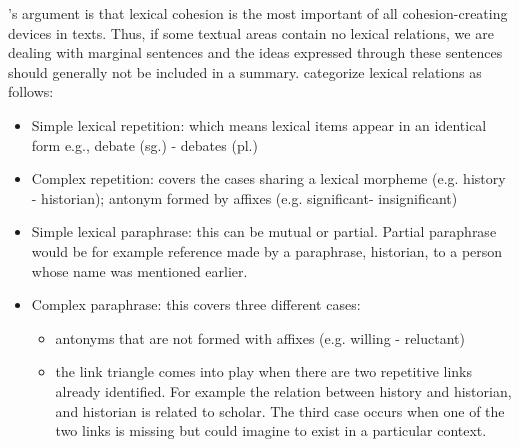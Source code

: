 's argument is that lexical cohesion is the most important of all cohesion-creating devices in texts. 
Thus, if some textual areas contain no lexical relations, we are dealing with marginal sentences and the ideas expressed through these sentences should generally not be included in a summary. 
 categorize lexical relations as follows:
\begin{itemize}
\item Simple lexical repetition: which means lexical items appear in an identical form e.g., debate (sg.) - debates (pl.)
\item Complex repetition: covers the cases sharing a lexical morpheme (e.g. history - historian); antonym formed by affixes (e.g. significant- insignificant)
\item Simple lexical paraphrase: this can be mutual or partial. 
Partial paraphrase would be for example reference made by a paraphrase, historian, to a person whose name was mentioned earlier. 
\item Complex paraphrase: this covers three different cases: 
\begin{itemize}
    \item antonyms that are not formed with affixes (e.g. willing - reluctant)
    \item the link triangle comes into play when there are two repetitive links already identified. 
    For example the relation between history and historian, and historian is related to scholar. 
    The third case occurs when one of the two links is missing but could imagine to exist in a particular context. 
\end{itemize} 
\end{itemize}

